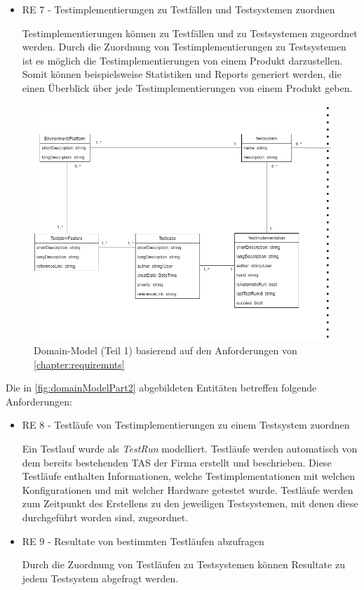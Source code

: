 \documentclass[a4paper, fontsize=11pt, parskip=half, twoside, headings=openright]{scrreprt}
\begin{document}
\begin{itemize}
		\item RE 7 - Testimplementierungen zu Testfällen und Testsystemen zuordnen
		
		Testimplementierungen können zu Testfällen und zu Testsystemen zugeordnet werden.
		Durch die Zuordnung von Testimplementierungen zu Testsystemen ist es möglich die Testimplementierungen von einem Produkt darzustellen.
		Somit können beispielsweise Statistiken und Reports generiert werden, die einen Überblick über jede Testimplementierungen von einem Produkt geben.
	\end{itemize}

	\begin{figure}[ht]
		\centering
		\includegraphics[scale=0.55]{assets/TCMS_DomainModel_part1.png}
		\caption{Domain-Model (Teil 1) basierend auf den Anforderungen von \autoref{chapter:requiremnts}}
		\label{fig:domainModelPart1}
	\end{figure}

	Die in \autoref{fig:domainModelPart2} abgebildeten Entitäten betreffen folgende Anforderungen:
	
	\begin{itemize}
		\item RE 8 - Testläufe von Testimplementierungen zu einem Testsystem zuordnen
		
		Ein Testlauf wurde als \emph{TestRun} modelliert.
		Testläufe werden automatisch von dem bereits bestehenden \ac{TAS} der Firma erstellt und beschrieben.
		Diese Testläufe enthalten Informationen, welche Testimplementationen mit welchen Konfigurationen und mit welcher Hardware getestet wurde.
		Testläufe werden zum Zeitpunkt des Erstellens zu den jeweiligen Testsystemen, mit denen diese durchgeführt worden sind, zugeordnet.
		
		\item RE 9 - Resultate von bestimmten Testläufen abzufragen
		
		Durch die Zuordnung von Testläufen zu Testsystemen können Resultate zu jedem Testsystem abgefragt werden.
	\end{itemize}
\end{document}
